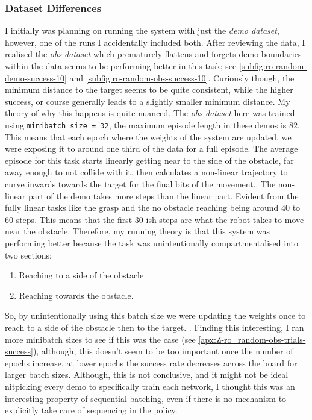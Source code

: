 \subsubsection{Dataset Differences}
I initially was planning on running the system with just the \emph{demo dataset}, however, one of the runs I accidentally included both. After reviewing the data, I realised the \emph{obs dataset} which prematurely flattens and forgets demo boundaries within the data seems to be performing better in this task; see \ref{subfig:ro-random-demo-success-10} and \ref{subfig:ro-random-obs-success-10}. Curiously though, the minimum distance to the target seems to be quite consistent, while the higher success, or course generally leads to a slightly smaller minimum distance.
My theory of why this happens is quite nuanced.\todo[color=purple]{} The \emph{obs dataset} here was trained using \verb|minibatch_size = 32|, the maximum episode length in these demos is $82$. This means that each epoch where the weights of the system are updated, we were exposing it to around one third of the data for a full episode. 
The average episode for this task starts linearly getting near to the side of the obstacle, far away enough to not collide with it, then calculates a non-linear trajectory to curve inwards towards the target for the final bits of the movement.. The non-linear part of the demo takes more steps than the linear part. Evident from the fully linear tasks like the grasp and the no obstacle reaching being around $40$ to $60$ steps. This means that the first $30$ ish steps are what the robot takes to move near the obstacle. Therefore, my running theory is that this system was performing better because the task was unintentionally compartmentalised into two sections:
\begin{enumerate}
  \item Reaching to a side of the obstacle
  \item Reaching towards the obstacle.
\end{enumerate}
So, by unintentionally using this batch size we were updating the weights once to reach to a side of the obstacle then to the target. . Finding this interesting, I ran more minibatch sizes to see if this was the case (see \ref{apx:Z-ro_random-obs-trials-success}), although, this doesn't seem to be too important once the number of epochs increase, at lower epochs the success rate decreases across the board for larger batch sizes. Although, this is not conclusive, and it might not be ideal nitpicking every demo to specifically train each network, I thought this was an interesting property of sequential batching, even if there is no mechanism to explicitly take care of sequencing in the policy.

